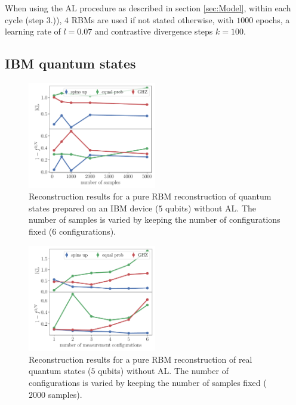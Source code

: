 \documentclass[pra,aps,showpacs,groupedaddress,superscriptaddress,twocolumn,toc=flat,biblatex,footinbib]{revtex4-1}
\begin{document}
When using the AL procedure as described in section \ref{sec:Model}, within each cycle (step 3.)), $4$ RBMs are used if not stated otherwise, with
$1000$ epochs, a learning rate of $l = 0.07$  and contrastive divergence steps $k = 100$.   

\subsection{IBM quantum states \label{appendix:IBM}}

\begin{figure}[htp]
	\centering
\includegraphics[width=0.5\textwidth]{Paper/Graphics/quantum_test_number_of_samples.pdf}
	\caption[]{Reconstruction results for a pure RBM reconstruction of quantum states prepared on an IBM device ($5$ qubits) without AL. The number of samples is varied by keeping the number of configurations fixed ($6$ configurations).}
\label{fig:WithoutAL1}
\end{figure}
\begin{figure}[htp]
	\centering
\includegraphics[width=0.5\textwidth]{Paper/Graphics/quantum_test_number_of_configs.pdf}
	\caption[]{Reconstruction results for a pure RBM reconstruction of real quantum states ($5$ qubits) without AL. The number of configurations is varied by keeping the number of samples fixed ($2000$ samples).}
\label{fig:WithoutAL2}
\end{figure}
\end{document}

